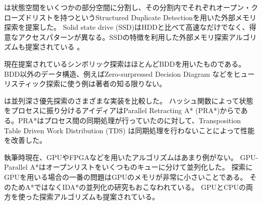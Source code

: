 \cite{zhou2004structured}は状態空間をいくつかの部分空間に分割し、その分割内でそれぞれオープン・クローズドリストを持つというStructured Duplicate Detectionを用いた外部メモリ探索を提案した。
Solid state drive (SSD)はHDDと比べて高速なだけでなく、得意なアクセスパターンが異なる。SSDの特徴を利用した外部メモリ探索アルゴリズムも提案されている \cite{lin2018revisiting}。

現在提案されているシンボリック探索はほとんどBDDを用いたものである。
BDD以外のデータ構造、例えばZero-surpressed Decision Diagram \cite{minato1993zero}などをヒューリスティック探索に使う例は著者の知る限りない。


\cite{kumar1988parallel}は並列深さ優先探索のさまざまな実装を比較した。
ハッシュ関数によって状態をプロセスに振り分けるアイディアはParallel Retracting A* (PRA*)からである\cite{evett1995massively}。PRA*はプロセス間の同期処理が行っていたのに対して、Transposition Table Driven Work Distribution (TDS) \cite{romein1999transposition}は同期処理を行わないことによって性能を改善した。

執筆時現在、GPUやFPGAなどを用いたアルゴリズムはあまり例がない。
GPU-Parallel A*はオープンリストをいくつものキューに分けて並列化した\cite{zhou2015massively}。
探索にGPUを用いる場合の一番の問題はGPUのメモリが非常に小さいことである。
そのためA*ではなくIDA*の並列化の研究もおこなわれている\cite{horie2017block}。
GPUとCPUの両方を使った探索アルゴリズムも提案されている\cite{sulewskiek11}。

% 
% 


